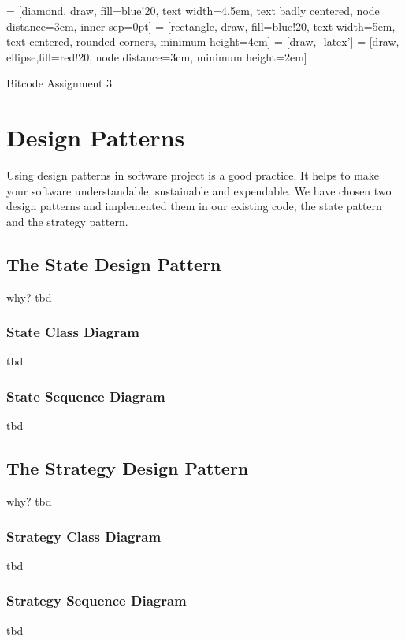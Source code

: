 \documentclass{article}
\begin{document}
 = [diamond, draw, fill=blue!20, 
    text width=4.5em, text badly centered, node distance=3cm, inner sep=0pt]
 = [rectangle, draw, fill=blue!20, 
    text width=5em, text centered, rounded corners, minimum height=4em]
 = [draw, -latex']
 = [draw, ellipse,fill=red!20, node distance=3cm,
    minimum height=2em]


\begin{titlepage}
	\Huge{Bitcode Assignment 3}
\end{titlepage}


\section{Design Patterns}
Using design patterns in software project is a good practice. It helps to make your software understandable, sustainable and expendable. We have chosen two design patterns and implemented them in our existing code, the state pattern and the strategy pattern.

\subsection{The State Design Pattern}
why? tbd

\subsubsection{State Class Diagram}
tbd

\subsubsection{State Sequence Diagram}
tbd

\subsection{The Strategy Design Pattern}
why? tbd

\subsubsection{Strategy Class Diagram}
tbd

\subsubsection{Strategy Sequence Diagram} 
tbd
\end{document}

